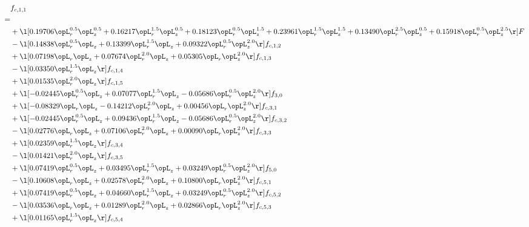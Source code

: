 \begin{alignat}{2} 
\label{eq:f_11_2} 
& f_{c,1,1} \nonumber \\ 
 = \\ 
& + \l[  0.19706 \opL_r^{0.5} \opL_z^{0.5} +  0.16217 \opL_r^{1.5} \opL_z^{0.5} +  0.18123 \opL_r^{0.5} \opL_z^{1.5} +  0.23961 \opL_r^{1.5} \opL_z^{1.5} +  0.13490 \opL_r^{2.5} \opL_z^{0.5} +  0.15918 \opL_r^{0.5} \opL_z^{2.5}  \r] F \nonumber \\ 
& - \l[  0.14838 \opL_r^{0.5} \opL_z +  0.13399 \opL_r^{1.5} \opL_z +  0.09322 \opL_r^{0.5} \opL_z^{2.0}  \r] f_{c,1,2} \nonumber \\ 
& + \l[  0.07198 \opL_r \opL_z +  0.07674 \opL_r^{2.0} \opL_z +  0.05305 \opL_r \opL_z^{2.0}  \r] f_{c,1,3} \nonumber \\ 
& - \l[  0.03350 \opL_r^{1.5} \opL_z  \r] f_{c,1,4} \nonumber \\ 
& + \l[  0.01535 \opL_r^{2.0} \opL_z  \r] f_{c,1,5} \nonumber \\ 
& + \l[  -0.02445 \opL_r^{0.5} \opL_z +  0.07077 \opL_r^{1.5} \opL_z   -0.05686 \opL_r^{0.5} \opL_z^{2.0}  \r] f_{3,0} \nonumber \\ 
& + \l[  -0.08329 \opL_r \opL_z   -0.14212 \opL_r^{2.0} \opL_z +  0.00456 \opL_r \opL_z^{2.0}  \r] f_{c,3,1} \nonumber \\ 
& + \l[  -0.02445 \opL_r^{0.5} \opL_z +  0.09436 \opL_r^{1.5} \opL_z   -0.05686 \opL_r^{0.5} \opL_z^{2.0}  \r] f_{c,3,2} \nonumber \\ 
& - \l[  0.02776 \opL_r \opL_z +  0.07106 \opL_r^{2.0} \opL_z +  0.00090 \opL_r \opL_z^{2.0}  \r] f_{c,3,3} \nonumber \\ 
& + \l[  0.02359 \opL_r^{1.5} \opL_z  \r] f_{c,3,4} \nonumber \\ 
& - \l[  0.01421 \opL_r^{2.0} \opL_z  \r] f_{c,3,5} \nonumber \\ 
& + \l[  0.07419 \opL_r^{0.5} \opL_z +  0.03495 \opL_r^{1.5} \opL_z +  0.03249 \opL_r^{0.5} \opL_z^{2.0}  \r] f_{5,0} \nonumber \\ 
& - \l[  0.10608 \opL_r \opL_z +  0.02578 \opL_r^{2.0} \opL_z +  0.10800 \opL_r \opL_z^{2.0}  \r] f_{c,5,1} \nonumber \\ 
& + \l[  0.07419 \opL_r^{0.5} \opL_z +  0.04660 \opL_r^{1.5} \opL_z +  0.03249 \opL_r^{0.5} \opL_z^{2.0}  \r] f_{c,5,2} \nonumber \\ 
& - \l[  0.03536 \opL_r \opL_z +  0.01289 \opL_r^{2.0} \opL_z +  0.02866 \opL_r \opL_z^{2.0}  \r] f_{c,5,3} \nonumber \\ 
& + \l[  0.01165 \opL_r^{1.5} \opL_z  \r] f_{c,5,4} \nonumber \\ 

\end{alignat}
